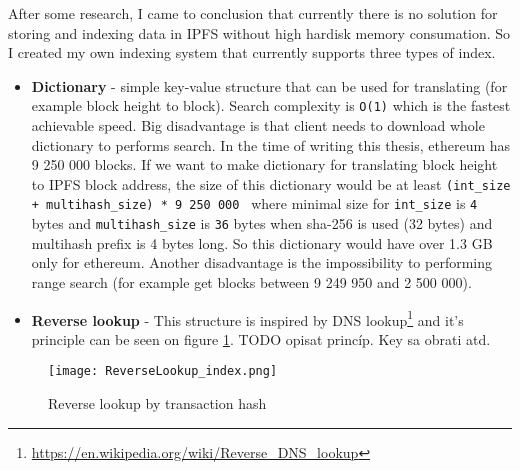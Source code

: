 After some research, I came to conclusion that currently there is no solution for storing and indexing data in IPFS without high hardisk memory consumation. So I created my own indexing system that currently supports three types of index.

\begin{itemize}
    \item \textbf{Dictionary} - simple key-value structure that can be used for translating (for example block height to block). Search complexity is \texttt{O(1)} which is the fastest achievable speed. Big disadvantage is that client needs to download whole dictionary to performs search. In the time of writing this thesis, ethereum has 9 250 000 blocks. If we want to make dictionary for translating block height to IPFS block address, the size of this dictionary would be at least \texttt{(int\_size + multihash\_size) * 9 250 000 } where minimal size for \texttt{int\_size} is \texttt{4} bytes and \texttt{multihash\_size} is \texttt{36} bytes when sha-256 is used (32 bytes) and multihash prefix is 4 bytes long. So this dictionary would have over 1.3 GB only for ethereum. Another disadvantage is the impossibility to performing range search (for example get blocks between 9 249 950 and 2 500 000).
    \item \textbf{Reverse lookup} - This structure is inspired by DNS lookup\footnote{\url{https://en.wikipedia.org/wiki/Reverse_DNS_lookup}} and it's principle can be seen on figure \ref{reverseLookupIndex}.
    TODO opisat princíp. Key sa obrati atd.
\end{itemize}


\begin{figure}[H]
    \centering
    \texttt{[image: ReverseLookup\_index.png]}
    \caption{Reverse lookup by transaction hash}
    \label{reverseLookupIndex}
\end{figure}